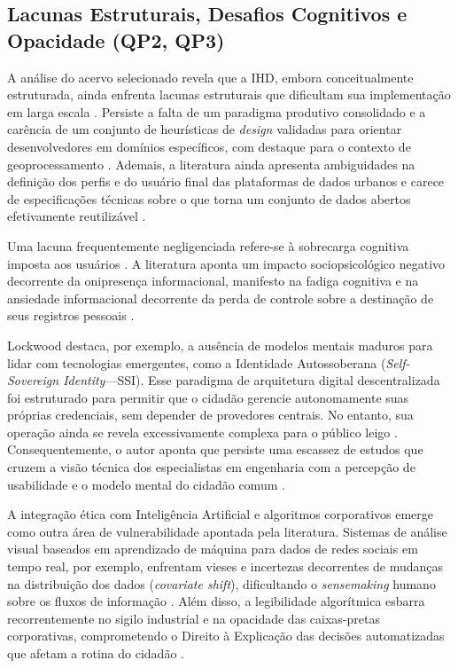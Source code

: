 \documentclass[12pt]{article}
\begin{document}
    \subsection{Lacunas Estruturais, Desafios Cognitivos e Opacidade (QP2, QP3)}

    A análise do acervo selecionado revela que a IHD, embora conceitualmente estruturada, ainda enfrenta lacunas estruturais que dificultam sua implementação em larga escala \cite{Sailaja2021Designing, Strey2019Human}. Persiste a falta de um paradigma produtivo consolidado e a carência de um conjunto de heurísticas de \textit{design} validadas para orientar desenvolvedores em domínios específicos, com destaque para o contexto de geoprocessamento \cite{Capeleti2024Human}. Ademais, a literatura ainda apresenta ambiguidades na definição dos perfis e do usuário final das plataformas de dados urbanos \cite{Belizario2023Interacao} e carece de especificações técnicas sobre o que torna um conjunto de dados abertos efetivamente reutilizável \cite{Koesten2020}.

    Uma lacuna frequentemente negligenciada refere-se à sobrecarga cognitiva imposta aos usuários \cite{Locoro2020}. A literatura aponta um impacto sociopsicológico negativo decorrente da onipresença informacional, manifesto na fadiga cognitiva e na ansiedade informacional decorrente da perda de controle sobre a destinação de seus registros pessoais \cite{cezar2023cognitive}.

    Lockwood \cite{Lockwood2021, Lockwood2020AnAccessible} destaca, por exemplo, a ausência de modelos mentais maduros para lidar com tecnologias emergentes, como a Identidade Autossoberana (\textit{Self-Sovereign Identity}---SSI). Esse paradigma de arquitetura digital descentralizada foi estruturado para permitir que o cidadão gerencie autonomamente suas próprias credenciais, sem depender de provedores centrais. No entanto, sua operação ainda se revela excessivamente complexa para o público leigo \cite{Lockwood2021, Lockwood2020AnAccessible}. Consequentemente, o autor aponta que persiste uma escassez de estudos que cruzem a visão técnica dos especialistas em engenharia com a percepção de usabilidade e o modelo mental do cidadão comum \cite{Lockwood2020AnAccessible}.

   A integração ética com Inteligência Artificial e algoritmos corporativos emerge como outra área de vulnerabilidade apontada pela literatura. Sistemas de análise visual baseados em aprendizado de máquina para dados de redes sociais em tempo real, por exemplo, enfrentam vieses e incertezas decorrentes de mudanças na distribuição dos dados (\textit{covariate shift}), dificultando o \textit{sensemaking} humano sobre os fluxos de informação \cite{Haghighati2020}. Além disso, a legibilidade algorítmica esbarra recorrentemente no sigilo industrial e na opacidade das caixas-pretas corporativas, comprometendo o Direito à Explicação das decisões automatizadas que afetam a rotina do cidadão \cite{Barreto2018} \cite{DeAlmeida2019}.
\end{document}
